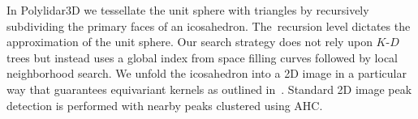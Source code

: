 In Polylidar3D we tessellate the unit sphere with triangles by recursively subdividing the primary faces of an icosahedron. The~recursion level dictates the approximation of the unit sphere. Our search strategy does not rely upon $K$-$D$ trees but instead uses a global index from space filling curves followed by local neighborhood search. We unfold the icosahedron into a 2D image in a particular way that guarantees equivariant kernels as outlined in~\cite{cohen_gauge_2019}. Standard 2D image peak detection is performed with nearby peaks clustered using \ac{AHC}.













